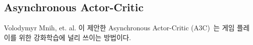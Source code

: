 \subsection{Asynchronous Actor-Critic}
Volodymyr Mnih, et. al. 이 제안한 Asynchronous Actor-Critic (A3C)~\cite{A3C}는 게임 플레이를 위한 강화학습에 널리 쓰이는 방법이다.

